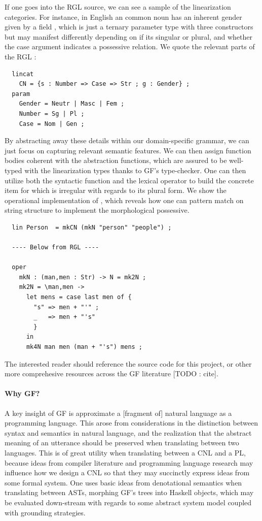 \documentclass[a4paper, 11pt]{article}
\begin{document}
If one goes into the RGL source, we can see a sample of the linearization
categories. For instance, in English an common noun  has an inherent
gender given by a field , which is just a ternary parameter
type with three constructors but may manifest differently
depending on if its singular or plural, and whether the case argument indicates
a possessive relation. We quote the relevant parts of the RGL :

\begin{verbatim}
  lincat
    CN = {s : Number => Case => Str ; g : Gender} ;
  param    
    Gender = Neutr | Masc | Fem ;
    Number = Sg | Pl ;
    Case = Nom | Gen ;
\end{verbatim}

By abstracting away these details within our domain-specific grammar, we can
just focus on capturing relevant semantic features. We can then assign function
bodies coherent with the abstraction functions, which are assured to be
well-typed with the linearization types thanks to GF's type-checker. One can
then utilize both the syntactic function  and the lexical operator
 to build the concrete item for  which is irregular with regards
to its plural form. We show the operational implementation of , which
reveals how one can pattern match on string structure to implement the
morphological possessive.

\begin{verbatim}
  lin Person  = mkCN (mkN "person" "people") ;

  ---- Below from RGL ----

  oper
    mkN : (man,men : Str) -> N = mk2N ;
    mk2N = \man,men ->
      let mens = case last men of {
        "s" => men + "'" ;
        _   => men + "'s"
        }
      in
      mk4N man men (man + "'s") mens ;
\end{verbatim}

The interested reader should reference the source code for this project, or
other more comprehesive resources across the GF literature [TODO : cite].

\paragraph{Why GF?}

A key insight of GF is approximate a [fragment of] natural language as a
programming language. This arose from considerations in the distinction between
syntax and semantics in natural language, and the realization that the abstract
meaning of an utterance should be preserved when translating between two
languages. This is of great utility when translating between a CNL and a PL,
because ideas from compiler literature and programming language research may
influence how we design a CNL so that they may succinctly express ideas from
some formal system. One uses basic ideas from denotational semantics when
translating between ASTs, morphing GF's trees into Haskell objects, which may be
evaluated down-stream with regards to some abstract system model coupled with
grounding strategies.
\end{document}
